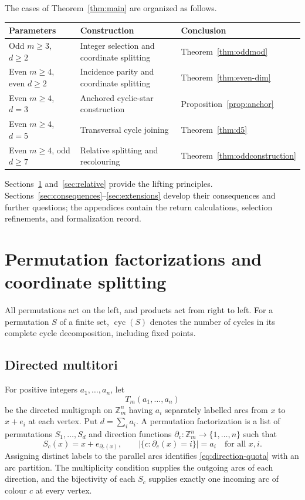\documentclass[11pt,reqno]{amsart}
\numberwithin{equation}{section}
\theoremstyle{definition}
\theoremstyle{remark}
\newcommand{\Zm}{\mathbb Z_m}
\newcommand{\cyc}{\operatorname{cyc}}
\begin{document}
\par\medskip
\noindent\begin{minipage}{\textwidth}
The cases of Theorem~\ref{thm:main} are organized as follows.
\begin{center}
\small
\renewcommand{\arraystretch}{1.12}
\begin{tabular}{@{}p{}p{}p{}@{}}
\toprule
Parameters & Construction & Conclusion\\
\midrule
Odd $m\ge3$, $d\ge2$ & Integer selection and coordinate splitting &
Theorem~\ref{thm:oddmod}\\[3pt]
Even $m\ge4$, even $d\ge2$ & Incidence parity and coordinate splitting &
Theorem~\ref{thm:even-dim}\\[3pt]
Even $m\ge4$, $d=3$ & Anchored cyclic-star construction &
Proposition~\ref{prop:anchor}\\[3pt]
Even $m\ge4$, $d=5$ & Transversal cycle joining &
Theorem~\ref{thm:d5}\\[3pt]
Even $m\ge4$, odd $d\ge7$ & Relative splitting and recolouring &
Theorem~\ref{thm:oddconstruction}\\
\bottomrule
\end{tabular}
\end{center}
\end{minipage}
\par\medskip
Sections~\ref{sec:preliminaries} and~\ref{sec:relative} provide the lifting
principles. Sections~\ref{sec:consequences}--\ref{sec:extensions} develop
their consequences and further questions; the appendices contain the
return calculations, selection refinements, and formalization record.


\section{Permutation factorizations and coordinate splitting}\label{sec:preliminaries}
All permutations act on the left, and products act from right to left. For a
permutation $S$ of a finite set, $\cyc(S)$ denotes the number of cycles in its
complete cycle decomposition, including fixed points.

\subsection{Directed multitori}
For positive integers $a_1,\ldots,a_n$, let
\[
 T_m(a_1,\ldots,a_n)
\]
be the directed multigraph on $\Zm^n$ having $a_i$ separately labelled arcs from
$x$ to $x+e_i$ at each vertex. Put $d=\sum_i a_i$. A permutation factorization is a
list of permutations $S_1,\ldots,S_d$ and direction functions
$\partial_c:\Zm^n\to\{1,\ldots,n\}$ such that
\begin{equation}\label{eq:direction-quota}
 S_c(x)=x+e_{\partial_c(x)},\qquad
 \bigl|\{c:\partial_c(x)=i\}\bigr|=a_i
 \quad\text{for all }x,i.
\end{equation}
Assigning distinct labels to the parallel arcs identifies
\eqref{eq:direction-quota} with an arc partition. The multiplicity
condition supplies the outgoing arcs of each direction, and the
bijectivity of each $S_c$ supplies exactly one incoming arc of colour
$c$ at every vertex.
\end{document}
